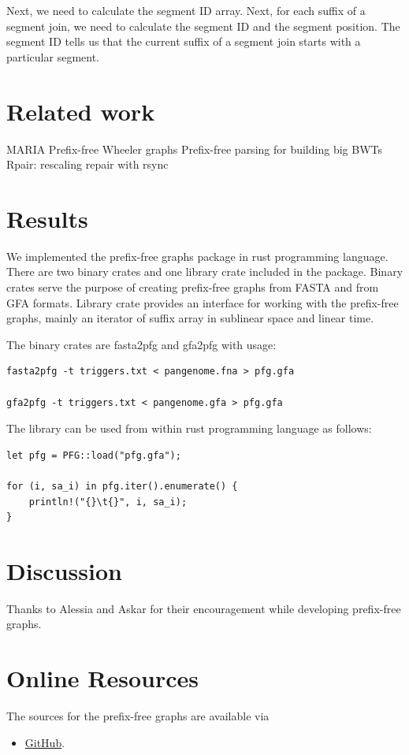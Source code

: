 \documentclass[twocolumn]{ceurart}
\begin{document}
Next, we need to calculate the segment ID array.
Next, for each suffix of a segment join, we need to calculate the segment ID
and the segment position.
The segment ID tells us that the current suffix of a segment join starts with a particular segment.


\section{Related work}
MARIA \cite{2022maria}
Prefix-free Wheeler graphs \cite{2022pfwg}
Prefix-free parsing for building big BWTs \cite{2019boucher}
Rpair: rescaling repair with rsync \cite{2019gagie}

\section{Results}
We implemented the prefix-free graphs package in rust programming language.
There are two binary crates and one library crate included in the package.
Binary crates serve the purpose of creating prefix-free graphs from FASTA and from GFA formats.
Library crate provides an interface for working with the prefix-free graphs,
mainly an iterator of suffix array in sublinear space and linear time.

The binary crates are fasta2pfg and gfa2pfg with usage:
\begin{verbatim}
fasta2pfg -t triggers.txt < pangenome.fna > pfg.gfa

gfa2pfg -t triggers.txt < pangenome.gfa > pfg.gfa
\end{verbatim}

The library can be used from within rust programming language as follows:

\begin{verbatim}
let pfg = PFG::load("pfg.gfa");

for (i, sa_i) in pfg.iter().enumerate() {
    println!("{}\t{}", i, sa_i);
}
\end{verbatim}

\section{Discussion}

\begin{acknowledgments}
    Thanks to Alessia and Askar for their encouragement while developing prefix-free graphs.
\end{acknowledgments}



\appendix

\section{Online Resources}

The sources for the prefix-free graphs are available via
\begin{itemize}
\item \href{https://github.com/andynet/pfg}{GitHub}.
\end{itemize}
\end{document}
